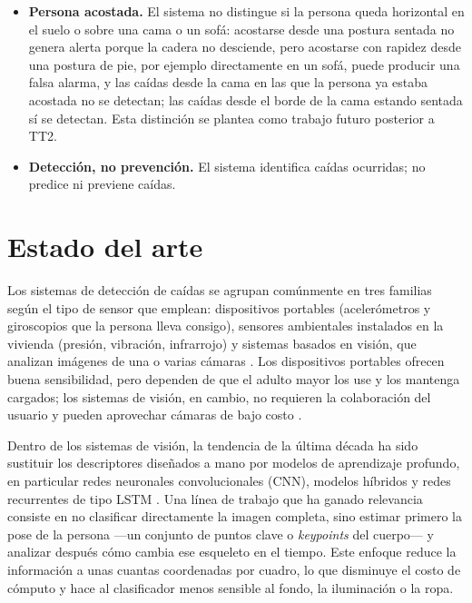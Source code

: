 \documentclass[12pt,a4paper,oneside]{book}
\theoremstyle{plain}
\theoremstyle{definition}
\theoremstyle{remark}
\begin{document}
\begin{itemize}
  \item \textbf{Persona acostada.} El sistema no distingue si la persona queda horizontal en el suelo o sobre una cama o un sofá: acostarse desde una postura sentada no genera alerta porque la cadera no desciende, pero acostarse con rapidez desde una postura de pie, por ejemplo directamente en un sofá, puede producir una falsa alarma, y las caídas desde la cama en las que la persona ya estaba acostada no se detectan; las caídas desde el borde de la cama estando sentada sí se detectan. Esta distinción se plantea como trabajo futuro posterior a TT2.
  \item \textbf{Detección, no prevención.} El sistema identifica caídas ocurridas; no predice ni previene caídas.
\end{itemize}

\section{Estado del arte}
\label{sec:estado-arte}

Los sistemas de detección de caídas se agrupan comúnmente en tres familias según el tipo de sensor que emplean: dispositivos portables (acelerómetros y giroscopios que la persona lleva consigo), sensores ambientales instalados en la vivienda (presión, vibración, infrarrojo) y sistemas basados en visión, que analizan imágenes de una o varias cámaras \parencite{igual2013challenges}. Los dispositivos portables ofrecen buena sensibilidad, pero dependen de que el adulto mayor los use y los mantenga cargados; los sistemas de visión, en cambio, no requieren la colaboración del usuario y pueden aprovechar cámaras de bajo costo \parencite{alam2022review}.

Dentro de los sistemas de visión, la tendencia de la última década ha sido sustituir los descriptores diseñados a mano por modelos de aprendizaje profundo, en particular redes neuronales convolucionales (CNN), modelos híbridos y redes recurrentes de tipo LSTM \parencite{alam2022review}. Una línea de trabajo que ha ganado relevancia consiste en no clasificar directamente la imagen completa, sino estimar primero la pose de la persona —un conjunto de puntos clave o \textit{keypoints} del cuerpo— y analizar después cómo cambia ese esqueleto en el tiempo. Este enfoque reduce la información a unas cuantas coordenadas por cuadro, lo que disminuye el costo de cómputo y hace al clasificador menos sensible al fondo, la iluminación o la ropa.
\end{document}
